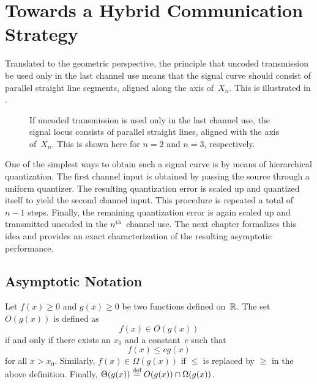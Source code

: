 \section{Towards a Hybrid Communication Strategy}

Translated to the geometric perspective, the principle that uncoded transmission
be used only in the last channel use means that the signal curve should consist
of parallel straight line segments, aligned along the axis of~$X_n$. This is
illustrated in .

\begin{figure}
  \centerline{%
  \subfloat[$n = 2$]{\label{fig:hybridlocus2}%
  }
  \hfil
  \subfloat[$n = 3$]{\label{fig:hybridlocus3}%
  }
  }
  \caption{If uncoded transmission is used only in the last channel use, the
  signal locus consists of parallel straight lines, aligned with the axis
  of~$X_n$. This is shown here for $n = 2$ and $n = 3$, respectively.}
  \label{fig:hybridlocus}
\end{figure}

One of the simplest ways to obtain such a signal curve is by means of
hierarchical quantization. The first channel input is obtained by passing the
source through a uniform quantizer. The resulting quantization error is scaled
up and quantized itself to yield the second channel input. This procedure is
repeated a total of $n-1$ steps. Finally, the remaining quantization error is
again scaled up and transmitted uncoded in the $n{^{\text{th}}}$ channel use. The next
chapter formalizes this idea and provides an exact characterization of the
resulting asymptotic performance. 


\begin{subappendices}
  \section{Asymptotic Notation}\label{app:asymptotic}

  \begin{definition}
    \label{def:bigo}
    Let $f(x) \ge 0$ and $g(x) \ge 0$ be two functions defined on~$\mathbb{R}$. The set
    $O(g(x))$ is defined as
    \begin{equation*}
      f(x) \in O(g(x))
    \end{equation*}
    if and only if there exists an $x_0$ and a constant~$c$ such that
    \begin{equation*}
      f(x) \le c g(x)
    \end{equation*}
    for all $x > x_0$. 
    Similarly, $f(x) \in \Omega(g(x))$ if $\le$ is replaced by $\ge$ in
    the above definition. Finally, $\Theta(g(x)) \stackrel{\text{def}}{=} O(g(x)) \cap
    \Omega(g(x))$.
  \end{definition}

  
\end{subappendices}
